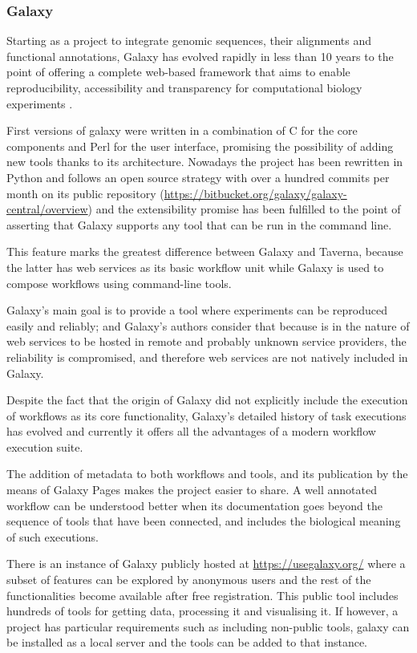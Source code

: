 \subsubsection{Galaxy}
Starting as a project to integrate genomic sequences, their alignments and functional annotations, Galaxy has evolved rapidly in less than 10 years to the point of offering a complete web-based framework that aims to enable reproducibility, accessibility and transparency for computational biology experiments \cite{GIA2005, GOE2010}.

First versions of galaxy were written in a combination of C for the core components and Perl for the user interface, promising the possibility of adding new tools thanks to its architecture. Nowadays the project has been rewritten in Python and follows an open source strategy with over a hundred commits per month on its public repository (\url{https://bitbucket.org/galaxy/galaxy-central/overview}) and the extensibility promise has been fulfilled to the point of asserting that Galaxy supports any tool that can be run in the command line.

This feature marks the greatest difference between Galaxy and Taverna, because the latter has web services as its basic workflow unit while Galaxy is used to compose workflows using command-line tools.

Galaxy's main goal is to provide a tool where experiments can be reproduced easily and reliably; and Galaxy's authors consider that because is in the nature of web services to be hosted in remote and probably unknown service providers, the reliability is compromised, and therefore web services are not natively included in Galaxy.

Despite the fact that the origin of Galaxy did not explicitly include the execution of workflows as its core functionality, Galaxy's detailed history of task executions has evolved and currently it offers all the advantages of a modern workflow execution suite.

The addition of metadata to both workflows and tools, and its publication by the means of Galaxy Pages makes the project easier to share. A well annotated workflow can be understood better when its documentation goes beyond the sequence of tools that have been connected, and includes the biological meaning of such executions.

There is an instance of Galaxy publicly hosted at \url{https://usegalaxy.org/} where a subset of features can be explored by anonymous users and the rest of the functionalities become available after free registration. This public tool includes hundreds of tools for getting data, processing it and visualising it. If however, a project has particular requirements such as including non-public tools, galaxy can be installed as a local server and the tools can be added to that instance.

